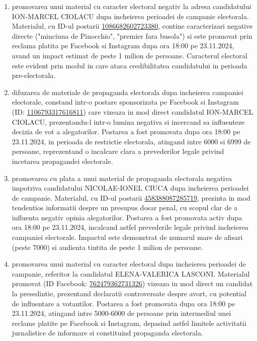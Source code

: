 \documentclass[a4paper,12pt]{article}
\begin{document}
\begin{enumerate}[leftmargin=*, label=\arabic*.)]
    \item promovarea unui material cu caracter electoral negativ la adresa candidatului ION-MARCEL CIOLACU dupa incheierea perioadei de campanie electorala. Materialul, cu ID-ul postarii \href{https://www.facebook.com/ads/library/?id=1086682602723380}{1086682602723380}, contine caracterizari negative directe ("minciuna de Pinocchio", "premier fara busola") si este promovat prin reclama platita pe Facebook si Instagram dupa ora 18:00 pe 23.11.2024, avand un impact estimat de peste 1 milion de persoane. Caracterul electoral este evident prin modul in care ataca credibilitatea candidatului in perioada pre-electorala.
    \item difuzarea de materiale de propaganda electorala dupa incheierea campaniei electorale, constand intr-o postare sponsorizata pe Facebook si Instagram (ID: \href{https://www.facebook.com/ads/library/?id=1106793317616811}{1106793317616811}) care vizeaza in mod direct candidatul ION-MARCEL CIOLACU, prezentandu-l intr-o lumina negativa si incercand sa influenteze decizia de vot a alegatorilor. Postarea a fost promovata dupa ora 18:00 pe 23.11.2024, in perioada de restrictie electorala, atingand intre 6000 si 6999 de persoane, reprezentand o incalcare clara a prevederilor legale privind incetarea propagandei electorale.
    \item promovarea cu plata a unui material de propaganda electorala negativa impotriva candidatului NICOLAE-IONEL CIUCA dupa incheierea perioadei de campanie. Materialul, cu ID-ul postarii \href{https://www.facebook.com/ads/library/?id=458388087285719}{458388087285719}, prezinta in mod tendentios informatii despre un presupus dosar penal, cu scopul clar de a influenta negativ opinia alegatorilor. Postarea a fost promovata activ dupa ora 18:00 pe 23.11.2024, incalcand astfel prevederile legale privind incheierea campaniei electorale. Impactul este demonstrat de numarul mare de afisari (peste 7000) si audienta tintita de peste 1 milion de persoane.
    \item promovarea unui material cu caracter electoral dupa incheierea perioadei de campanie, referitor la candidatul ELENA-VALERICA LASCONI. Materialul promovat (ID Facebook: \href{https://www.facebook.com/ads/library/?id=762479362731326}{762479362731326}) vizeaza in mod direct un candidat la presedintie, prezentand declaratii controversate despre avort, cu potential de influentare a votantilor. Postarea a fost promovata dupa ora 18:00 pe 23.11.2024, atingand intre 5000-6000 de persoane prin intermediul unei reclame platite pe Facebook si Instagram, depasind astfel limitele activitatii jurnalistice de informare si constituind propaganda electorala.
\end{enumerate}
\end{document}
